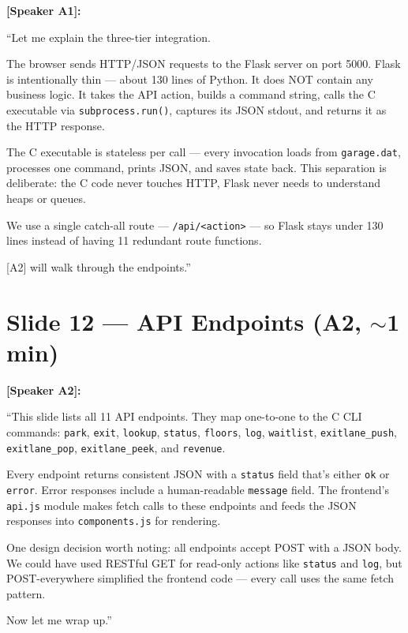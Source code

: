 \documentclass[12pt, a4paper]{article}
\begin{document}
\textbf{[Speaker A1]:}

``Let me explain the three-tier integration.

The browser sends HTTP/JSON requests to the Flask server on port 5000. Flask is intentionally thin --- about 130 lines of Python. It does NOT contain any business logic. It takes the API action, builds a command string, calls the C executable via \texttt{subprocess.run()}, captures its JSON stdout, and returns it as the HTTP response.

The C executable is stateless per call --- every invocation loads from \texttt{garage.dat}, processes one command, prints JSON, and saves state back. This separation is deliberate: the C code never touches HTTP, Flask never needs to understand heaps or queues.

We use a single catch-all route --- \texttt{/api/<action>} --- so Flask stays under 130 lines instead of having 11 redundant route functions.

[A2] will walk through the endpoints.''

\section{Slide 12 --- API Endpoints (A2, $\sim$1 min)}

\textbf{[Speaker A2]:}

``This slide lists all 11 API endpoints. They map one-to-one to the C CLI commands: \texttt{park}, \texttt{exit}, \texttt{lookup}, \texttt{status}, \texttt{floors}, \texttt{log}, \texttt{waitlist}, \texttt{exitlane\_push}, \texttt{exitlane\_pop}, \texttt{exitlane\_peek}, and \texttt{revenue}.

Every endpoint returns consistent JSON with a \texttt{status} field that's either \texttt{ok} or \texttt{error}. Error responses include a human-readable \texttt{message} field. The frontend's \texttt{api.js} module makes fetch calls to these endpoints and feeds the JSON responses into \texttt{components.js} for rendering.

One design decision worth noting: all endpoints accept POST with a JSON body. We could have used RESTful GET for read-only actions like \texttt{status} and \texttt{log}, but POST-everywhere simplified the frontend code --- every call uses the same fetch pattern.

Now let me wrap up.''
\end{document}
